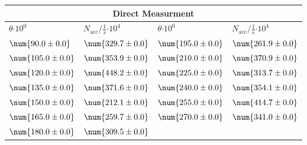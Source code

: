 \begin{tabular}{|p{}|p{}||p{}|p{}|}
\hline
\multicolumn{4}{|c|}{Direct Measurment}\\
\hline
$\theta$$\cdot 10^{0}$&$N_\text{acc}/\frac{1}{s}$$\cdot 10^{4}$&$\theta$$\cdot 10^{0}$&$N_\text{acc}/\frac{1}{s}$$\cdot 10^{4}$\\
\hline
$\num{90.0\pm 0.0}$&$\num{329.7\pm 0.0}$&$\num{195.0\pm 0.0}$&$\num{261.9\pm 0.0}$\\
$\num{105.0\pm 0.0}$&$\num{353.9\pm 0.0}$&$\num{210.0\pm 0.0}$&$\num{370.9\pm 0.0}$\\
$\num{120.0\pm 0.0}$&$\num{448.2\pm 0.0}$&$\num{225.0\pm 0.0}$&$\num{313.7\pm 0.0}$\\
$\num{135.0\pm 0.0}$&$\num{371.6\pm 0.0}$&$\num{240.0\pm 0.0}$&$\num{354.1\pm 0.0}$\\
$\num{150.0\pm 0.0}$&$\num{212.1\pm 0.0}$&$\num{255.0\pm 0.0}$&$\num{414.7\pm 0.0}$\\
$\num{165.0\pm 0.0}$&$\num{259.7\pm 0.0}$&$\num{270.0\pm 0.0}$&$\num{341.0\pm 0.0}$\\
$\num{180.0\pm 0.0}$&$\num{309.5\pm 0.0}$&&\\
\hline
\end{tabular}